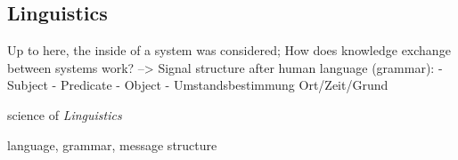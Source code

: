 %
%
%
%
%
%
%

\subsection{Linguistics}
\label{linguistics_heading}

Up to here, the inside of a system was considered;
How does knowledge exchange between systems work?
--> Signal structure after human language (grammar):
- Subject
- Predicate
- Object
- Umstandsbestimmung Ort/Zeit/Grund

science of \emph{Linguistics}

language, grammar, message structure
